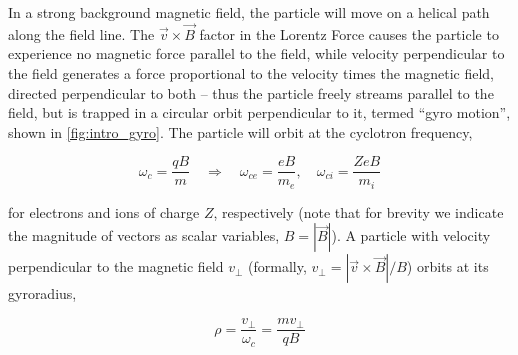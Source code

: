 \begin{figure}
 \pushtooutside
\end{figure}

\noindent In a strong background magnetic field, the particle will move on a helical path along the field line.  The $\vec{v} \times \vec{B}$ factor in the Lorentz Force causes the particle to experience no magnetic force parallel to the field, while velocity perpendicular to the field generates a force proportional to the velocity times the magnetic field, directed perpendicular to both -- thus the particle freely streams parallel to the field, but is trapped in a circular orbit perpendicular to it, termed ``gyro motion'', shown in \cref{fig:intro_gyro}.  The particle will orbit at the cyclotron frequency,

\begin{equation}\label{eq:omegac}
 \omega_c = \frac{qB}{m} \quad\Rightarrow\quad \omega_{ce} = \frac{eB}{m_e}, \quad \omega_{ci} = \frac{ZeB}{m_i}
\end{equation}

\noindent for electrons and ions of charge $Z$, respectively (note that for brevity we indicate the magnitude of vectors as scalar variables, \eg $B = \left|\vec{B}\right|$).  A particle with velocity perpendicular to the magnetic field $v_\perp$ (formally, $v_\perp = \left|\vec{v} \times \vec{B}\right|/B$) orbits at its gyroradius,

\begin{equation}\label{eq:gyroradius}
 \rho = \frac{v_\perp}{\omega_c} = \frac{mv_\perp}{qB}
\end{equation}

